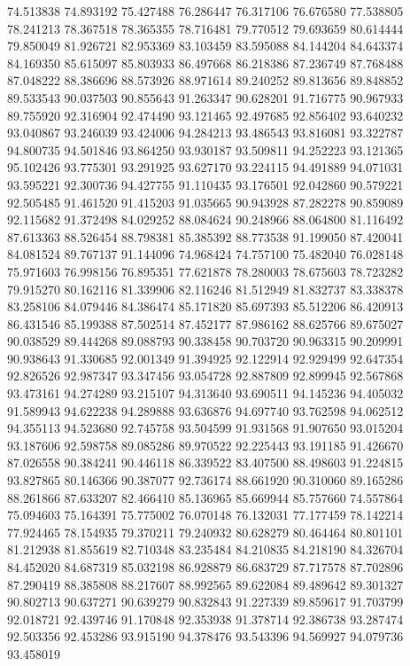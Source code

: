 74.513838
74.893192
75.427488
76.286447
76.317106
76.676580
77.538805
78.241213
78.367518
78.365355
78.716481
79.770512
79.693659
80.614444
79.850049
81.926721
82.953369
83.103459
83.595088
84.144204
84.643374
84.169350
85.615097
85.803933
86.497668
86.218386
87.236749
87.768488
87.048222
88.386696
88.573926
88.971614
89.240252
89.813656
89.848852
89.533543
90.037503
90.855643
91.263347
90.628201
91.716775
90.967933
89.755920
92.316904
92.474490
93.121465
92.497685
92.856402
93.640232
93.040867
93.246039
93.424006
94.284213
93.486543
93.816081
93.322787
94.800735
94.501846
93.864250
93.930187
93.509811
94.252223
93.121365
95.102426
93.775301
93.291925
93.627170
93.224115
94.491889
94.071031
93.595221
92.300736
94.427755
91.110435
93.176501
92.042860
90.579221
92.505485
91.461520
91.415203
91.035665
90.943928
87.282278
90.859089
92.115682
91.372498
84.029252
88.084624
90.248966
88.064800
81.116492
87.613363
88.526454
88.798381
85.385392
88.773538
91.199050
87.420041
84.081524
89.767137
91.144096
74.968424
74.757100
75.482040
76.028148
75.971603
76.998156
76.895351
77.621878
78.280003
78.675603
78.723282
79.915270
80.162116
81.339906
82.116246
81.512949
81.832737
83.338378
83.258106
84.079446
84.386474
85.171820
85.697393
85.512206
86.420913
86.431546
85.199388
87.502514
87.452177
87.986162
88.625766
89.675027
90.038529
89.444268
89.088793
90.338458
90.703720
90.963315
90.209991
90.938643
91.330685
92.001349
91.394925
92.122914
92.929499
92.647354
92.826526
92.987347
93.347456
93.054728
92.887809
92.899945
92.567868
93.473161
94.274289
93.215107
94.313640
93.690511
94.145236
94.405032
91.589943
94.622238
94.289888
93.636876
94.697740
93.762598
94.062512
94.355113
94.523680
92.745758
93.504599
91.931568
91.907650
93.015204
93.187606
92.598758
89.085286
89.970522
92.225443
93.191185
91.426670
87.026558
90.384241
90.446118
86.339522
83.407500
88.498603
91.224815
93.827865
80.146366
90.387077
92.736174
88.661920
90.310060
89.165286
88.261866
87.633207
82.466410
85.136965
85.669944
85.757660
74.557864
75.094603
75.164391
75.775002
76.070148
76.132031
77.177459
78.142214
77.924465
78.154935
79.370211
79.240932
80.628279
80.464464
80.801101
81.212938
81.855619
82.710348
83.235484
84.210835
84.218190
84.326704
84.452020
84.687319
85.032198
86.928879
86.683729
87.717578
87.702896
87.290419
88.385808
88.217607
88.992565
89.622084
89.489642
89.301327
90.802713
90.637271
90.639279
90.832843
91.227339
89.859617
91.703799
92.018721
92.439746
91.170848
92.353938
91.378714
92.386738
93.287474
92.503356
92.453286
93.915190
94.378476
93.543396
94.569927
94.079736
93.458019
